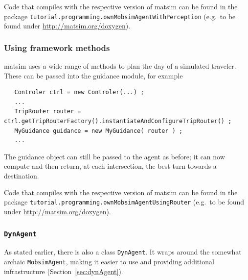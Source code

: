 Code that compiles with the respective version of \acrshort{matsim} can be found in the package \lstinline$tutorial.programming.ownMobsimAgentWithPerception$ (e.g.\ to be found under \url{http://matsim.org/doxygen}).

\subsubsection{Using framework methods}

\acrshort{matsim} uses a wide range of methods to plan the day of a simulated traveler.  These can be passed into the guidance module, for example
\begin{lstlisting}
   Controler ctrl = new Controler(...) ;
   ...
   TripRouter router = ctrl.getTripRouterFactory().instantiateAndConfigureTripRouter() ;
   MyGuidance guidance = new MyGuidance( router ) ;
   ...
\end{lstlisting}
The guidance object can still be passed to the agent as before; it can now compute and then return, at each intersection, the best turn towards a destination.

Code that compiles with the respective version of \acrshort{matsim} can be found in the package \lstinline$tutorial.programming.ownMobsimAgentUsingRouter$ (e.g.\ to be found under \url{http://matsim.org/doxygen}).

\subsubsection{\lstinline{DynAgent}}

As stated earlier, there is also a class \lstinline$DynAgent$. It wraps around the somewhat archaic \lstinline$MobsimAgent$, making it easier to use and providing additional infrastructure (Section~\ref{sec:dynAgent}).

